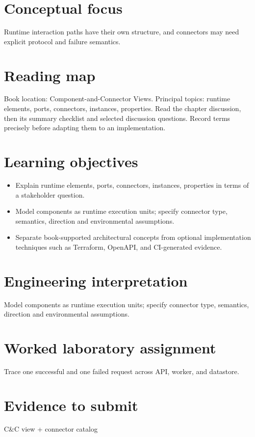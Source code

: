 \documentclass[10pt,letterpaper]{article}
\begin{document}
\DocProvenance
\section{Conceptual focus}
Runtime interaction paths have their own structure, and connectors may need explicit protocol and failure semantics.

\section{Reading map}
Book location: Component-and-Connector Views. Principal topics: runtime elements, ports, connectors, instances, properties. Read the chapter discussion, then its summary checklist and selected discussion questions. Record terms precisely before adapting them to an implementation.

\section{Learning objectives}
\begin{itemize}
\item Explain runtime elements, ports, connectors, instances, properties in terms of a stakeholder question.
\item Model components as runtime execution units; specify connector type, semantics, direction and environmental assumptions.
\item Separate book-supported architectural concepts from optional implementation techniques such as Terraform, OpenAPI, and CI-generated evidence.
\end{itemize}
\section{Engineering interpretation}
Model components as runtime execution units; specify connector type, semantics, direction and environmental assumptions.

\section{Worked laboratory assignment}
Trace one successful and one failed request across API, worker, and datastore.

\section{Evidence to submit}
C\&C view + connector catalog
\end{document}
